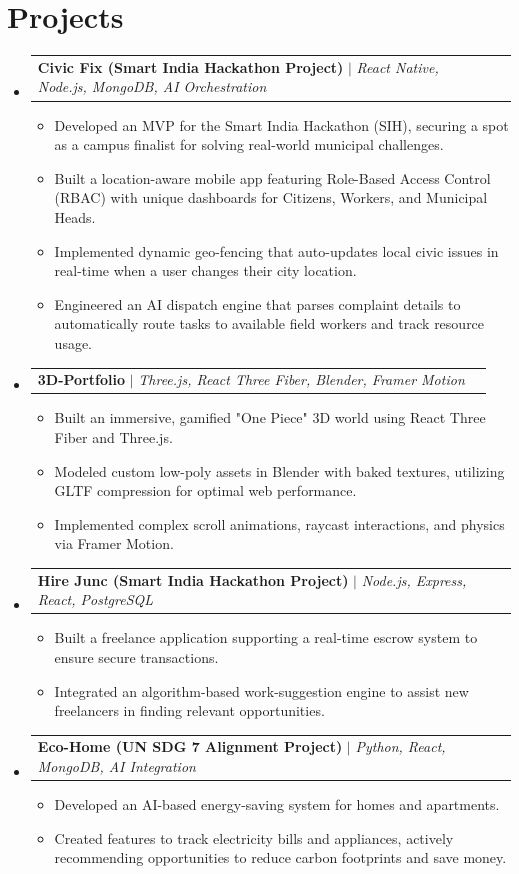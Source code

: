 \documentclass[11pt,a4paper]{article}
\makeatletter
\newcommand{\resumeItem}[1]{
  \item\small{
    {#1 \vspace{-2pt}}
  }
}
\newcommand{\resumeProjectHeading}[2]{
    \item
    \begin{tabular*}{0.97\textwidth}{l@{\extracolsep{\fill}}r}
      \small#1 & #2 \\
    \end{tabular*}\vspace{-7pt}
}
\newcommand{\resumeSubHeadingListStart}{\begin{itemize}[leftmargin=0.15in, label={}]}
\newcommand{\resumeSubHeadingListEnd}{\end{itemize}}
\newcommand{\resumeItemListStart}{\begin{itemize}}
\newcommand{\resumeItemListEnd}{\end{itemize}\vspace{-5pt}}
\makeatother
\begin{document}
\section{Projects}
    \resumeSubHeadingListStart
      \resumeProjectHeading
          {\textbf{Civic Fix (Smart India Hackathon Project)} $|$ \emph{React Native, Node.js, MongoDB, AI Orchestration}}{}
          \resumeItemListStart
            \resumeItem{Developed an MVP for the Smart India Hackathon (SIH), securing a spot as a campus finalist for solving real-world municipal challenges.}
            \resumeItem{Built a location-aware mobile app featuring Role-Based Access Control (RBAC) with unique dashboards for Citizens, Workers, and Municipal Heads.}
            \resumeItem{Implemented dynamic geo-fencing that auto-updates local civic issues in real-time when a user changes their city location.}
            \resumeItem{Engineered an AI dispatch engine that parses complaint details to automatically route tasks to available field workers and track resource usage.}
          \resumeItemListEnd
      \resumeProjectHeading
          {\textbf{3D-Portfolio} $|$ \emph{Three.js, React Three Fiber, Blender, Framer Motion}}{}
          \resumeItemListStart
            \resumeItem{Built an immersive, gamified "One Piece" 3D world using React Three Fiber and Three.js.}
            \resumeItem{Modeled custom low-poly assets in Blender with baked textures, utilizing GLTF compression for optimal web performance.}
            \resumeItem{Implemented complex scroll animations, raycast interactions, and physics via Framer Motion.}
          \resumeItemListEnd
      \resumeProjectHeading
          {\textbf{Hire Junc (Smart India Hackathon Project)} $|$ \emph{Node.js, Express, React, PostgreSQL}}{}
          \resumeItemListStart
            \resumeItem{Built a freelance application supporting a real-time escrow system to ensure secure transactions.}
            \resumeItem{Integrated an algorithm-based work-suggestion engine to assist new freelancers in finding relevant opportunities.}
          \resumeItemListEnd
      \resumeProjectHeading
          {\textbf{Eco-Home (UN SDG 7 Alignment Project)} $|$ \emph{Python, React, MongoDB, AI Integration}}{}
          \resumeItemListStart
            \resumeItem{Developed an AI-based energy-saving system for homes and apartments.}
            \resumeItem{Created features to track electricity bills and appliances, actively recommending opportunities to reduce carbon footprints and save money.}
          \resumeItemListEnd
    \resumeSubHeadingListEnd
\end{document}
